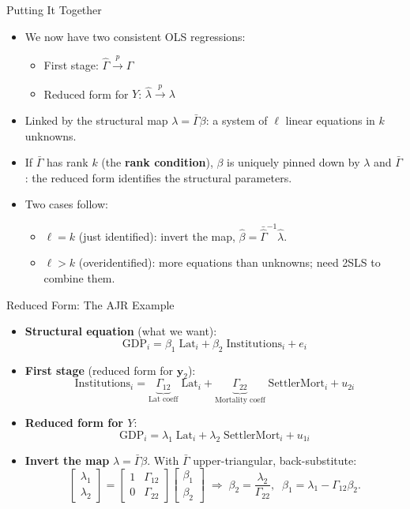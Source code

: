 \documentclass[aspectratio=169, handout]{beamer}
\numberwithin{equation}{section}
\begin{document}
\begin{frame}{Putting It Together}
\begin{itemize}
\item We now have two consistent OLS regressions:
\begin{itemize}
\item First stage: $\hat{\Gamma}\xrightarrow{p}\Gamma$
\item Reduced form for $Y$: $\hat{\lambda}\xrightarrow{p}\lambda$
\end{itemize}
\item Linked by the structural map $\lambda = \bar{\Gamma}\beta$: a system of $\ell$ linear equations in $k$ unknowns.
\item If $\bar{\Gamma}$ has rank $k$ (the \textbf{rank condition}), $\beta$ is uniquely pinned down by $\lambda$ and $\bar{\Gamma}$: the reduced form identifies the structural parameters.
\item Two cases follow:
\begin{itemize}
\item $\ell=k$ (just identified): invert the map, $\hat{\beta} = \bar{\hat{\Gamma}}^{-1}\hat{\lambda}$.
\item $\ell>k$ (overidentified): more equations than unknowns; need 2SLS to combine them.
\end{itemize}
\end{itemize}
\end{frame}


\begin{frame}{Reduced Form: The AJR Example}
\begin{itemize}
\item \textbf{Structural equation} (what we want):
$$\text{GDP}_i = \beta_1\;\text{Lat}_i + \beta_2\;\text{Institutions}_i + e_i$$
\item \textbf{First stage} (reduced form for $\bm{y}_2$):
$$\text{Institutions}_i = \underbrace{\Gamma_{12}}_{\text{Lat coeff}}\;\text{Lat}_i + \underbrace{\Gamma_{22}}_{\text{Mortality coeff}}\;\text{SettlerMort}_i + u_{2i}$$
\item \textbf{Reduced form for $Y$}:
$$\text{GDP}_i = \lambda_1\;\text{Lat}_i + \lambda_2\;\text{SettlerMort}_i + u_{1i}$$
\item \textbf{Invert the map} $\lambda = \bar{\Gamma}\beta$. With $\bar{\Gamma}$ upper-triangular, back-substitute:
$$\begin{bmatrix}\lambda_1\\ \lambda_2\end{bmatrix} = \begin{bmatrix} 1 & \Gamma_{12}\\ 0 & \Gamma_{22}\end{bmatrix}\begin{bmatrix}\beta_1\\ \beta_2\end{bmatrix} \;\Longrightarrow\; \beta_2 = \frac{\lambda_2}{\Gamma_{22}}, \;\; \beta_1 = \lambda_1 - \Gamma_{12}\beta_2.$$
\end{itemize}
\end{frame}
\end{document}
